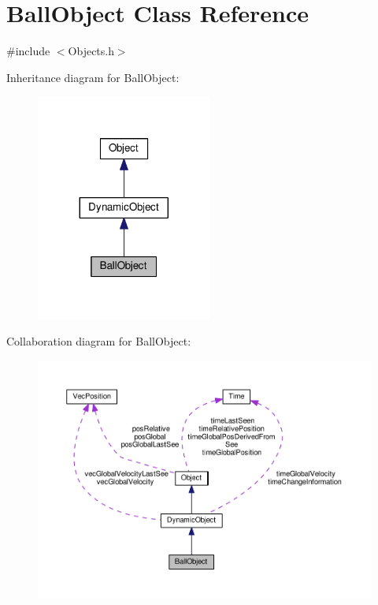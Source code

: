 \hypertarget{classBallObject}{}\section{Ball\+Object Class Reference}
\label{classBallObject}


{\ttfamily \#include $<$Objects.\+h$>$}



Inheritance diagram for Ball\+Object\+:
\nopagebreak
\begin{figure}[H]
\begin{center}
\leavevmode
\includegraphics[width=164pt]{classBallObject__inherit__graph}
\end{center}
\end{figure}


Collaboration diagram for Ball\+Object\+:
\nopagebreak
\begin{figure}[H]
\begin{center}
\leavevmode
\includegraphics[width=350pt]{classBallObject__coll__graph}
\end{center}
\end{figure}
